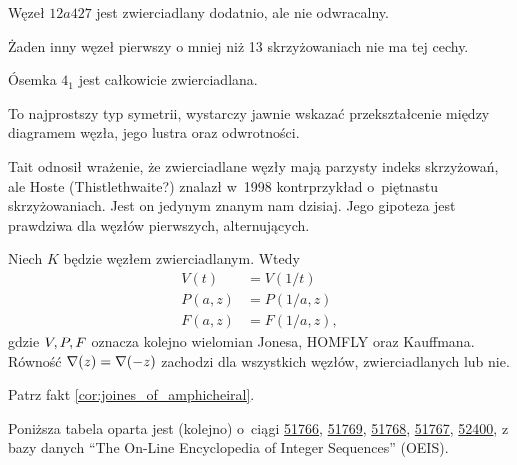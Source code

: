 
\begin{example}
    Węzeł $12a427$ jest zwierciadlany dodatnio, ale nie odwracalny.
\end{example}

Żaden inny węzeł pierwszy o mniej niż 13 skrzyżowaniach nie ma tej cechy.

\begin{example}
    \label{property_of_eight_knot}
    Ósemka $4_1$ jest całkowicie zwierciadlana.
\end{example}

To najprostszy typ symetrii, wystarczy jawnie wskazać przekształcenie między diagramem węzła, jego lustra oraz odwrotności.

Tait odnosił wrażenie, że zwierciadlane węzły mają parzysty indeks skrzyżowań,
ale Hoste (Thistlethwaite?) znalazł w~1998 kontrprzykład o~piętnastu skrzyżowaniach.
Jest on jedynym znanym nam dzisiaj.
Jego gipoteza jest prawdziwa dla węzłów pierwszych, alternujących.

\begin{proposition}
    Niech $K$ będzie węzłem zwierciadlanym.
    Wtedy
    \begin{align}
        V(t) & = V(1/t) \\
        P(a, z) & = P(1/a, z) \\
        F(a, z) & = F(1/a, z),
    \end{align}
    gdzie $V, P, F$ oznacza kolejno wielomian Jonesa, HOMFLY oraz Kauffmana.
    Równość $\nabla(z) = \nabla(-z)$ zachodzi dla wszystkich węzłów, zwierciadlanych lub nie.

    Patrz fakt \ref{cor:joines_of_amphicheiral}.
\end{proposition}

Poniższa tabela oparta jest (kolejno) o~ciągi
\href{https://oeis.org/A051766}{51766},
\href{https://oeis.org/A051769}{51769},
\href{https://oeis.org/A051768}{51768},
\href{https://oeis.org/A051767}{51767},
\href{https://oeis.org/A052400}{52400},
z bazy danych ``The On-Line Encyclopedia of Integer Sequences'' (OEIS).

